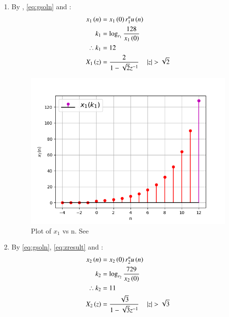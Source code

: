 \documentclass[journal,12pt,twocolumn]{IEEEtran}
\theoremstyle{remark}
\begin{document}
\begin{enumerate}[label=(\alph*)]
\item By , \eqref{eq:gsoln} and : %
\begin{align}
    x_1\left(n\right) &= x_1\left(0\right) r_1^nu\left(n\right) \\
    k_1 &= \log_{r_1}{\frac{128}{x_1\left(0\right)}} \\
    \therefore k_1 &= 12 \\
	X_1\left(z\right) &= \frac{2}{1 - \sqrt{2}z^{-1}} \quad \left\vert z\right\vert > \sqrt{2}
\end{align}

\begin{figure}[h!]
    \renewcommand\thefigure{1}
    \centering
    \includegraphics[width=\columnwidth]{figs/a.png}
    \caption[short]{Plot of $x_1$ vs n. See }
    \label{fig:img1}
\end{figure}



\item By \eqref{eq:gsoln}, \eqref{eq:zresult} and : %
\begin{align}
    x_2\left(n\right) &= x_2\left(0\right) r_2^nu\left(n\right) \\
    k_2 &= \log_{r_2}{\frac{729}{x_2\left(0\right)}} \\
    \therefore k_2 &= 11 \\
    X_2\left(z\right) &= \frac{\sqrt{3}}{1 - \sqrt{3}z^{-1}} \quad \left\vert z\right\vert > \sqrt{3} 
\end{align}


\end{enumerate}
\end{document}
